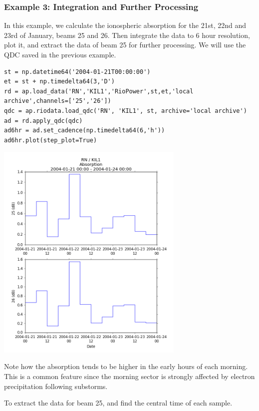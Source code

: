\documentclass{article}
\begin{document}
\subsubsection{Example 3: Integration and Further Processing}

In this example, we calculate the ionospheric absorption for the 21st, 22nd and 23rd of January, beams 25 and 26. Then integrate the data to 6 hour resolution, plot it, and extract the data of beam 25 for further processing. We will use the QDC saved in the previous example.

\begin{lstlisting}[style=pythonstyle]
st = np.datetime64('2004-01-21T00:00:00')
et = st + np.timedelta64(3,'D')
rd = ap.load_data('RN','KIL1','RioPower',st,et,'local archive',channels=['25','26'])
qdc = ap.riodata.load_qdc('RN', 'KIL1', st, archive='local archive')
ad = rd.apply_qdc(qdc)
ad6hr = ad.set_cadence(np.timedelta64(6,'h'))
ad6hr.plot(step_plot=True)
\end{lstlisting}

\begin{center}
\includegraphics[width=9cm]{images/figure_6.png}
\end{center}

\noindent Note how the absorption tends to be higher in the early hours of each morning. This is a common feature since the morning sector is strongly affected by electron precipitation following substorms.
 
To extract the data for beam 25, and find the central time of each sample.
\end{document}
